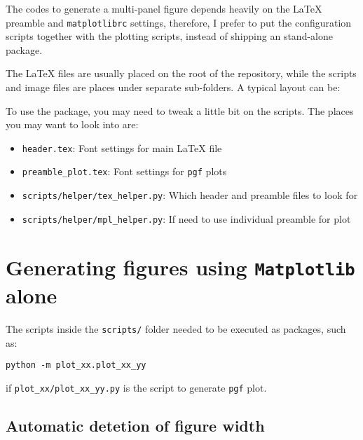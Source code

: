 The \py{} codes to generate a multi-panel figure depends heavily on
the \LaTeX{} preamble and \texttt{matplotlibrc} settings, therefore, I
prefer to put the configuration scripts together with the plotting
scripts, instead of shipping an stand-alone \py{} package.

The \LaTeX{} files are usually placed on the root of the repository,
while the \py{} scripts and image files are places under separate
sub-folders. A typical layout can be:
\vspace{1em}

To use the package, you may need to tweak a little bit on the \py{}
scripts. The places you may want to look into are:
\begin{itemize}
\item \verb|header.tex|: Font settings for main \LaTeX{} file
\item \verb|preamble_plot.tex|: Font settings for \texttt{pgf} plots
\item \verb|scripts/helper/tex_helper.py|: Which header and preamble files to look for
\item \verb|scripts/helper/mpl_helper.py|: If need to use individual preamble for \mpl{} plot
\end{itemize}

\section{Generating figures using \texttt{Matplotlib} alone}
\label{sec:matpl-only-figure}

The \py{} scripts inside the \texttt{scripts/} folder needed to be
executed as packages, such as:
\begin{verbatim}
python -m plot_xx.plot_xx_yy
\end{verbatim}
if \verb|plot_xx/plot_xx_yy.py| is the script to generate \texttt{pgf}
plot.

\subsection{Automatic detetion of figure width}
\label{sec:autom-detet-figure}


